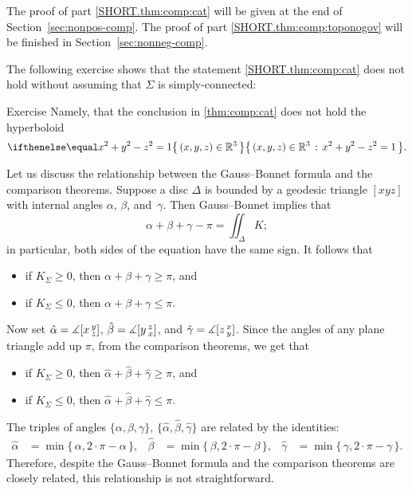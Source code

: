 The proof of part \ref{SHORT.thm:comp:cat} will be given at the end of Section~\ref{sec:nonpos-comp}.
The proof of part \ref{SHORT.thm:comp:toponogov} will be finished in Section~\ref{sec:nonneg-comp}.

The following exercise shows that the statement \ref{SHORT.thm:comp:cat} does not hold without assuming that $\Sigma$ is simply-connected:

\begin{thm}{Exercise}\label{ex:thm:comp:cat:nsc}
Namely, that the conclusion in \ref{thm:comp:cat} does not hold the hyperboloid
\[\set{(x,y,z)\in\mathbb{R}^3}{x^2+y^2-z^2=1}.\]
\end{thm}

Let us discuss the relationship between the Gauss--Bonnet formula and the comparison theorems.
Suppose a disc $\Delta$ is bounded by a geodesic triangle $[xyz]$ with internal angles $\alpha$, $\beta$, and~$\gamma$.
Then Gauss--Bonnet implies that 
\[\alpha+\beta+\gamma-\pi=\iint_\Delta K;\]
in particular, both sides of the equation have the same sign.
It follows that
\begin{itemize}
\item if $K_\Sigma\ge 0$, then $\alpha+\beta+\gamma\ge\pi$, and
\item if $K_\Sigma\le 0$, then $\alpha+\beta+\gamma\le\pi$.
\end{itemize}

Now set 
$\hat\alpha=\measuredangle[x\,{}^{y}_{z}]$,
$\hat\beta=\measuredangle[y\,{}^{z}_{x}]$,
and $\hat\gamma=\measuredangle[z\,{}^{x}_{y}]$.
Since the angles of any plane triangle add up $\pi$, from the comparison theorems, we get that
\begin{itemize}
\item if $K_\Sigma\ge 0$, then $\hat\alpha+\hat\beta+\hat\gamma\ge\pi$, and
\item if $K_\Sigma\le 0$, then $\hat\alpha+\hat\beta+\hat\gamma\le\pi$.
\end{itemize}

The triples of angles $\{ \alpha , \beta , \gamma \}$, $\{ \hat\alpha , \hat\beta , \hat\gamma \}$ are related by the identities:
\begin{align*}
\hat \alpha&=\min\{\,\alpha,2\cdot\pi-\alpha\,\},
&
\hat\beta &=\min\{\,\beta,2\cdot\pi-\beta\,\},
&
\hat\gamma&=\min\{\,\gamma,2\cdot\pi-\gamma\,\}.
\end{align*}
Therefore, despite the Gauss--Bonnet formula and the comparison theorems are closely related,
this relationship is not straightforward.

